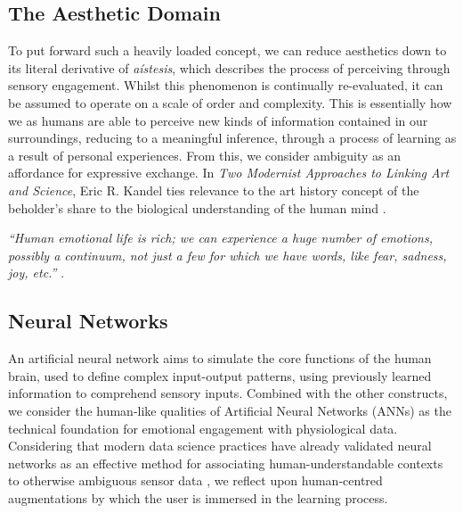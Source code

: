 
\subsection*{The Aesthetic Domain}

To put forward such a heavily loaded concept, we can reduce aesthetics down to its literal derivative of \textit{aístesis}, which describes the process of perceiving through sensory engagement. Whilst this phenomenon is continually re-evaluated, it can be assumed to operate on a scale of order and complexity. This is essentially how we as humans are able to perceive new kinds of information contained in our surroundings, reducing to a meaningful inference, through a process of learning as a result of personal experiences. From this, we consider ambiguity as an affordance for expressive exchange. In \textit{Two Modernist Approaches to Linking Art and Science}, Eric R. Kandel ties relevance to the art history concept of the beholder's share to the biological understanding of the human mind \cite{kandel_two_2013}.

\textit{``Human emotional life is rich; we can experience a huge number of emotions, possibly a continuum, not just a few for which we have words, like fear, sadness, joy, etc.''} \citeauthor{perlovsky_aesthetic_2014} \cite{perlovsky_aesthetic_2014}.


\subsection*{Neural Networks}

An artificial neural network aims to simulate the core functions of the human brain, used to define complex input-output patterns, using previously learned information to comprehend sensory inputs. Combined with the other constructs, we consider the human-like qualities of Artificial Neural Networks (ANNs) as the technical foundation for emotional engagement with physiological data. Considering that modern data science practices have already validated neural networks as an effective method for associating human-understandable contexts to otherwise ambiguous sensor data \cite{bota_review_2019}, we reflect upon human-centred augmentations by which the user is immersed in the learning process.

